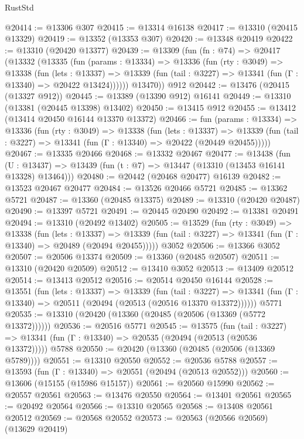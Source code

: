 \begin{lexlean}{RustStd}
\begin{coremodule}
@20414 := @13306 @307
@20415 := @13314 @16138
@20417 := @13310 (@20415 @13329)
@20419 := @13352 (@13353 @307)
@20420 := @13348 @20419
@20422 := @13310 (@20420 @13377)
@20439 := @13309
    (fun (fn : @74) =>
    @20417
      (@13332
        (@13335
          (fun (params : @13334) =>
          @13336
            (fun (rty : @3049) =>
            @13338
              (fun (lets : @13337) =>
              @13339 (fun (tail : @3227) => @13341 (fun (Γ : @13340) => @20422 @13424))))))
        @13470))
    @912
@20442 := @13476 (@20415 (@13327 @912))
@20445 := @13389 (@13390 @912) @16141
@20449 := @13310 (@13381 (@20445 @13398) @13402)
@20450 := @13415 @912
@20455 := @13412 (@13414 @20450 @16144 @13370 @13372)
@20466 := fun (params : @13334) =>
  @13336
    (fun (rty : @3049) =>
    @13338
      (fun (lets : @13337) =>
      @13339 (fun (tail : @3227) => @13341 (fun (Γ : @13340) => @20422 (@20449 @20455)))))
@20467 := @13335 @20466
@20468 := @13332 @20467
@20477 := @13438
    (fun (U : @13437) => @13439 (fun (t : @7) => @13447 (@13310 (@13453 @16141 @13328) @13464)))
@20480 := @20442 (@20468 @20477) @16139
@20482 := @13523 @20467 @20477
@20484 := @13526 @20466 @5721
@20485 := @13362 @5721
@20487 := @13360 (@20485 @13375)
@20489 := @13310 (@20420 @20487)
@20490 := @13397 @5721
@20491 := @20445 @20490
@20492 := @13381 @20491
@20494 := @13310 (@20492 @13402)
@20505 := @13529
    (fun (rty : @3049) =>
    @13338
      (fun (lets : @13337) =>
      @13339 (fun (tail : @3227) => @13341 (fun (Γ : @13340) => @20489 (@20494 @20455)))))
    @3052
@20506 := @13366 @3052
@20507 := @20506 @13374
@20509 := @13360 (@20485 @20507)
@20511 := @13310 (@20420 @20509)
@20512 := @13410 @3052
@20513 := @13409 @20512
@20514 := @13413 @20512
@20516 := @20514 @20450 @16144
@20528 := @13551
    (fun (lets : @13337) =>
    @13339
      (fun (tail : @3227) =>
      @13341 (fun (Γ : @13340) => @20511 (@20494 (@20513 (@20516 @13370 @13372))))))
    @5771
@20535 := @13310 (@20420 (@13360 (@20485 (@20506 (@13369 (@5772 @13372))))))
@20536 := @20516 @5771
@20545 := @13575
    (fun (tail : @3227) => @13341 (fun (Γ : @13340) => @20535 (@20494 (@20513 (@20536 @13372)))))
    @5788
@20550 := @20420 (@13360 (@20485 (@20506 (@13369 @5789))))
@20551 := @13310 @20550
@20552 := @20536 @5788
@20557 := @13593 (fun (Γ : @13340) => @20551 (@20494 (@20513 @20552)))
@20560 := @13606 (@15155 (@15986 @15157))
@20561 := @20560 @15990
@20562 := @20557 @20561
@20563 := @13476 @20550
@20564 := @13401 @20561
@20565 := @20492 @20564
@20566 := @13310 @20565
@20568 := @13408 @20561 @20512
@20569 := @20568 @20552
@20573 := @20563 (@20566 @20569) (@13629 @20419)

\end{coremodule}
\end{lexlean}
